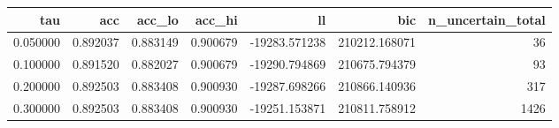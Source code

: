 \begin{tabular}{rrrrrrr}
\toprule
tau & acc & acc\_lo & acc\_hi & ll & bic & n\_uncertain\_total \\
\midrule
0.050000 & 0.892037 & 0.883149 & 0.900679 & -19283.571238 & 210212.168071 & 36 \\
0.100000 & 0.891520 & 0.882027 & 0.900679 & -19290.794869 & 210675.794379 & 93 \\
0.200000 & 0.892503 & 0.883408 & 0.900930 & -19287.698266 & 210866.140936 & 317 \\
0.300000 & 0.892503 & 0.883408 & 0.900930 & -19251.153871 & 210811.758912 & 1426 \\
\bottomrule
\end{tabular}
